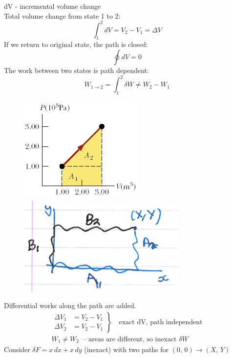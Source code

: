 \documentclass[a4paper, 11pt, normalem]{report}
\begin{document}
dV - incremental volume change \\
Total volume change from state 1 to 2:
\begin{equation*}
    \int_{1}^{2} dV = V_2 - V_1 = \Delta V
\end{equation*}
If we return to original state, the path is closed:
\begin{equation*}
    \oint dV = 0
\end{equation*}
The work between two states is path dependent:
\begin{equation*}
    W_{1 \to 2} = \int_{1}^{2} \delta W \neq W_2 - W_1
\end{equation*}
\begin{figure}
    \begin{center}
        \includegraphics[scale=0.6]{WorkPV.png}\\
        \includegraphics[scale=0.5]{XYCord.png}
    \end{center}
    \vspace{-40pt}
\end{figure}
Differential works along the path are added.
\begin{gather*}
\left.\begin{aligned}
       \Delta V_1 &= V_2 - V_1 \\
       \Delta V_2 &= V_2 - V_1
      \end{aligned}
\right\}
    \quad \text{exact dV, path independent} \\
    W_1 \neq W_2 ~ \text{ -- areas are different, so inexact } \delta W
\end{gather*}
Consider $\delta F = x\,dx + x\,dy$ (inexact) with two paths for $(0,\,0) \to (X,\,Y)$
\end{document}
